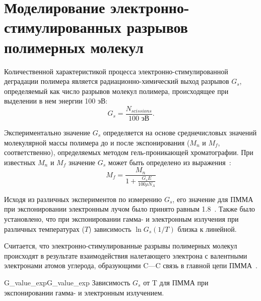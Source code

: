 \section{Моделирование электронно-стимулированных разрывов полимерных молекул}
Количественной характеристикой процесса электронно-стимулированной деградации полимера является радиационно-химический выход разрывов $G_s$, определяемый как число разрывов молекул полимера, происходящее при выделении в нем энергии 100 эВ:
\begin{equation}
	G_s = \frac{N_{scissions}}{100 \text{ эВ}}.
\end{equation}

Экспериментально значение $G_s$ определяется на основе среднечисловых значений молекулярной массы полимера до и после экспонирования ($M_n$ и $M_f$, соответственно), определяемых методом гель-проникающей хроматографии. При известных $M_n$ и $M_f$ значение $G_s$ может быть определено из выражения~\cite{Greeneich1979_Mf_Mn}:
\begin{equation}
	{M_f = \frac{\displaystyle M_n}{1 + \frac{\displaystyle G_s E}{\displaystyle 100 \rho N_A}}}
\end{equation}

Исходя из различных экспериментов по измерению $G_s$, его значение для ПММА при экспонировании электронным лучом было принято равным 1.8~\cite{Charlesby_1964_Gs}. Также было установлено, что при экспонировании гамма- и электронным излучения при различных температурах ($T$) зависимость $\ln G_s (1/T)$ близка к линейной.

Считается, что электронно-стимулированные разрывы полимерных молекул происходят в результате взаимодействия налетающего электрона с валентными электронами атомов углерода, образующими C---C связь в главной цепи ПММА~\cite{Stepanova_2006}.

\begin{narrowfig}{G_value_exp}{G_value_exp}
	Зависимость $G_s$ от T для ПММА при экспонировании гамма- и электронным излучением.
\end{narrowfig}